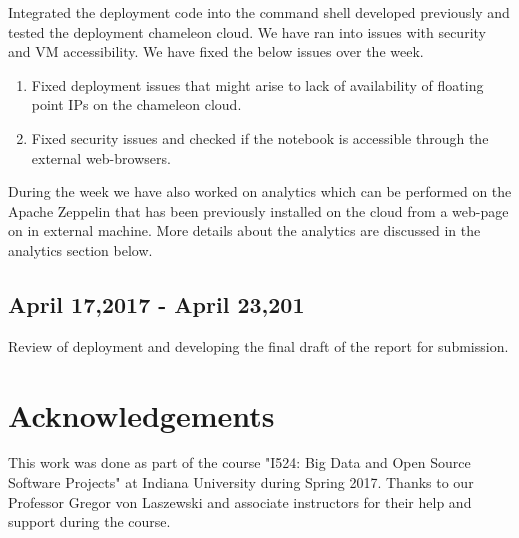 \documentclass[9pt,twocolumn,twoside]{../../styles/osajnl}
\begin{document}
	Integrated the deployment code into the command shell developed 
	previously and tested the deployment chameleon cloud. We have ran 
	into issues with security and VM accessibility. We have fixed the 
	below issues over the week.
	\begin{enumerate}
		\item Fixed deployment issues that might arise to lack of 
		availability of  floating point IPs on the chameleon cloud. 
		\item Fixed security issues and checked if the notebook is 
		accessible through the external web-browsers.
	\end{enumerate}
	
	During the week we have also worked on analytics which can be 
	performed on the Apache Zeppelin that has been previously 
	installed 
	on the cloud from a web-page on in external machine. More details 
	about the analytics are discussed in the analytics section below.
	
	\subsection{April 17,2017 - April 23,201}
	
	Review of deployment and developing the final draft of the report 
	for 
	submission.
	
	\section*{Acknowledgements}
	
	This work was done as part of the course "I524: Big Data and
	Open Source Software Projects" at Indiana University during
	Spring 2017. Thanks to our Professor Gregor von Laszewski
	and associate instructors for their help and support during the
	course.
	
\end{document}
